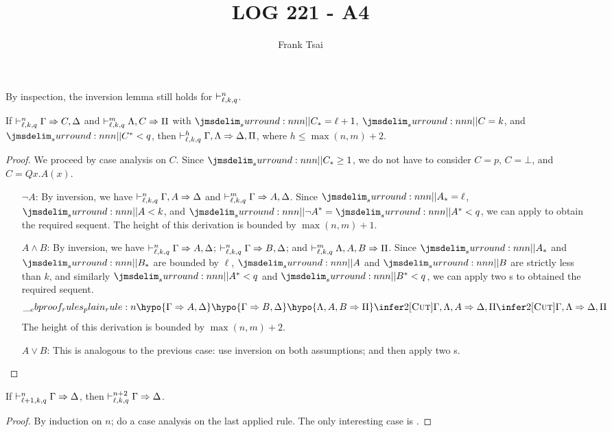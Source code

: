 \documentclass[a4paper]{article}
\title{LOG 221 - A4}
\author{Frank Tsai}
\begin{document}
\maketitle

By inspection, the inversion lemma still holds for $\mathrel{\vdash^{n}_{\ell,k,q}}$.
\begin{lemma}\label{0000}
  If $\mathrel{\vdash^{n}_{\ell,k,q}} \Gamma \Rightarrow C,\Delta$ and $\mathrel{\vdash^{m}_{\ell,k,q}} \Lambda,C \Rightarrow \Pi$ with $\dRank{C} = \ell + 1$, $\cRank{C} = k$, and $\qRank{C} < q$, then $\mathrel{\vdash^{h}_{\ell,k,q}} \Gamma,\Lambda \Rightarrow \Delta,\Pi$, where $h \leq \max(n,m) + 2$.
\end{lemma}
\begin{proof}
  We proceed by case analysis on $C$.
  Since $\dRank{C} \geq 1$, we do not have to consider $C = p$, $C = \bot$, and $C = Qx.A(x)$.
  \begin{itemize}
  \item[$\lnot A$:] By inversion, we have $\mathrel{\vdash^{n}_{\ell,k,q}} \Gamma,A \Rightarrow \Delta$ and $\mathrel{\vdash^{m}_{\ell,k,q}} \Gamma \Rightarrow A, \Delta$.
    Since $\dRank{A} = \ell$, $\cRank{A} < k$, and $\qRank{\lnot A} = \qRank{A} < q$, we can apply \rCut{} to obtain the required sequent.
    The height of this derivation is bounded by $\max(n,m) + 1$.
  \item[$A \wedge B$:] By inversion, we have $\mathrel{\vdash^{n}_{\ell,k,q}} \Gamma \Rightarrow A,\Delta$; $\mathrel{\vdash^{n}_{\ell,k,q}} \Gamma \Rightarrow B,\Delta$; and $\mathrel{\vdash^{m}_{\ell,k,q}} \Lambda,A,B \Rightarrow \Pi$.
    Since $\dRank{A}$ and $\dRank{B}$ are bounded by $\ell$, $\cRank{A}$ and $\cRank{B}$ are strictly less than $k$, and similarly $\qRank{A} < q$ and $\qRank{B} < q$, we can apply two \rCut{}s to obtained the required sequent.
    \[
      \ebrule{
        \hypo{\Gamma \Rightarrow A,\Delta}
        \hypo{\Gamma \Rightarrow B,\Delta}
        \hypo{\Lambda,A,B \Rightarrow \Pi}
        \infer2[\rCut]{\Gamma,\Lambda,A \Rightarrow \Delta,\Pi}
        \infer2[\rCut]{\Gamma,\Lambda \Rightarrow \Delta,\Pi}
      }
    \]
    The height of this derivation is bounded by $\max(n,m) + 2$.
  \item[$A \vee B$:] This is analogous to the previous case: use inversion on both assumptions; and then apply two \rCut{}s.
  \end{itemize}
\end{proof}

\begin{lemma}
  If $\mathrel{\vdash^{n}_{\ell+1,k,q}} \Gamma \Rightarrow \Delta$, then $\mathrel{\vdash^{n + 2}_{\ell,k,q}} \Gamma \Rightarrow \Delta$.
\end{lemma}
\begin{proof}
  By induction on $n$; do a case analysis on the last applied rule.
  The only interesting case is \rCut.
\end{proof}
\end{document}
